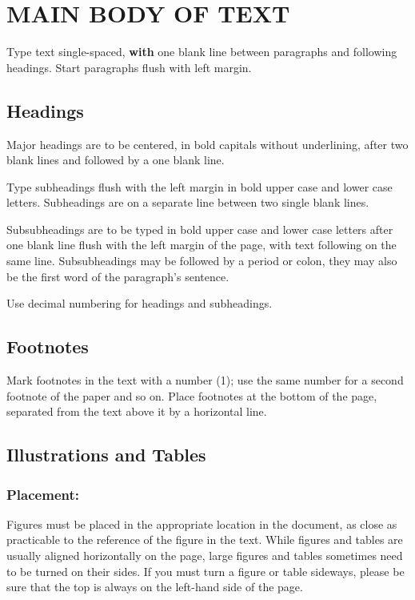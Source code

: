 \documentclass{isprs} %
\begin{document}
\section{MAIN BODY OF TEXT}\label{sec:MAIN BODY OF TEXT}

Type text single-spaced, \textbf{with} one blank line between paragraphs and 
following headings. Start paragraphs flush with left margin.


\subsection{Headings}\label{sec:Headings}

Major headings are to be centered, in bold capitals without 
underlining, after two blank lines and followed by a one blank line.

Type subheadings flush with the left margin in bold upper case and lower 
case letters. Subheadings are on a separate line between two single blank lines.

Subsubheadings are to be typed in bold upper case and lower case letters 
after one blank line flush with the left margin of the page, with text 
following on the same line. Subsubheadings may be followed by a period 
or colon, they may also be the first word of the paragraph's sentence.

Use decimal numbering for headings and subheadings.


\subsection{Footnotes}\label{sec:Footnotes}

Mark footnotes in the text with a number (1); use the same number for a 
second footnote of the paper and so on. Place footnotes at the bottom of 
the page, separated from the text above it by a horizontal line.


\subsection{Illustrations and Tables}\label{sec:Illustrations and Tables}

\subsubsection{Placement:}\label{sec:Placement}

Figures must be placed in the appropriate location in the document, 
as close as practicable to the reference of the figure in the text. 
While figures and tables are usually aligned horizontally on the page, 
large figures and tables sometimes need to be turned on their sides. 
If you must turn a figure or table sideways, please be sure that the 
top is always on the left-hand side of the page.
\end{document}
